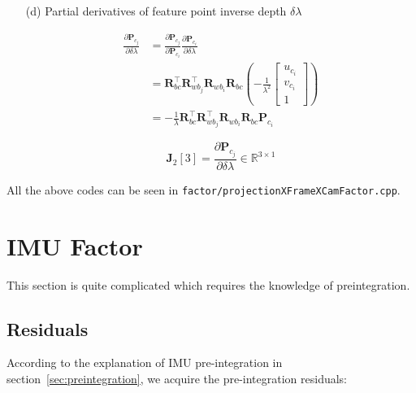 \documentclass[12pt]{report}   %
\begin{document}
\begin{enumerate}
	\item[(d)] Partial derivatives of {\color{blue}feature point inverse depth $\delta \lambda$}
	
	\begin{equation}
	\begin{aligned} 
	\frac{\partial \mathbf{P}_{c_{j}}}{\partial \delta \lambda} 
	&=
	\frac{\partial \mathbf{P}_{c_{j}}}{\partial \mathbf{P}_{c_{i}}} 
	\frac{\partial \mathbf{P}_{c_{i}}}{\partial \delta \lambda} \\ 
	&=
	\mathbf{R}_{b c}^{\top} \mathbf{R}_{w b_{j}}^{\top} \mathbf{R}_{w b_{i}} \mathbf{R}_{b c}
	\left(-\frac{1}{\lambda^{2}}
	\left[\begin{array}{c}{u_{c_{i}}} \\ {v_{c_{i}}} \\ {1}\end{array}\right]\right) \\ 
	&=
	-\frac{1}{\lambda} \mathbf{R}_{b c}^{\top} \mathbf{R}_{w b_{j}}^{\top} \mathbf{R}_{w b_{i}} \mathbf{R}_{b c} \mathbf{P}_{c_{i}} 
	\end{aligned}
	\end{equation}
	
	\begin{equation}
	\mathbf{J}_2[3] =
	\frac{\partial \mathbf{P}_{c_{j}}}{\partial \delta \lambda}
	\in \mathbb{R}^{3 \times 1}
	\end{equation}
	
\end{enumerate}


All the above codes can be seen in \verb|factor/projectionXFrameXCamFactor.cpp|.

\section{IMU Factor}

This section is quite complicated which requires the knowledge of preintegration.

\subsection{Residuals}

According to the explanation of IMU pre-integration in section~\ref{sec:preintegration}, we acquire the pre-integration residuals:
\end{document}
